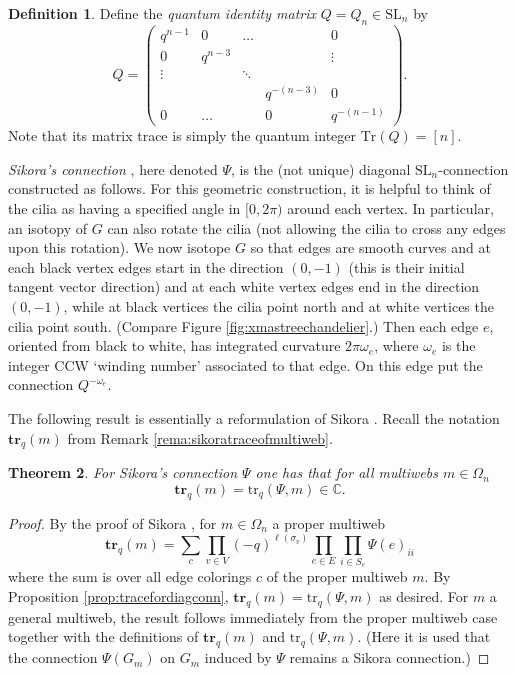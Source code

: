 \documentclass[12pt, reqno]{amsart}
\newtheorem{theo}{Theorem}[section]
\theoremstyle{definition}
\newtheorem{defi}[theo]{Definition}
\newcommand{\Tr}{\mathrm{Tr}}%
\newcommand{\trqc}{\mathrm{tr}_q}%
\newcommand{\trq}{\mathbf{tr}_q}%
\newcommand{\SL}{\mathrm{SL}}%
\begin{document}
\begin{defi}
Define the \emph{quantum identity matrix} $Q=Q_n\in\SL_n$ by
$$ 
Q = \begin{pmatrix} 
q^{n-1} & 0          & \dots&  & 0 \\
0          & q^{n-3} &&&\vdots \\
\vdots    &      & \ddots  &&\\
         &      & &q^{-(n-3)} & 0 \\
0          & \dots     && 0       & q^{-(n-1)}
\end{pmatrix}.
$$
Note that its matrix trace is simply the quantum integer $\Tr(Q) = [n]$. 

\emph{Sikora's connection} \cite[equation (5)]{sikora1}, 
here denoted $\Psi$, is the (not unique) diagonal $\SL_n$-connection constructed as follows.    For this geometric construction, it is helpful to think of the cilia as having a specified  angle in $[0,2\pi)$ around each vertex.    In particular, an isotopy of $G$ can also rotate the cilia (not allowing the cilia to cross any edges upon this rotation).  We now isotope $G$ so that edges are smooth curves and at each black vertex edges start in the direction  $(0,-1)$ (this is their initial tangent vector direction) and at each white vertex edges end in the direction $(0,-1)$, while at black vertices the cilia point north and at white vertices the cilia point south.  (Compare Figure \ref{fig:xmastreechandelier}.)  Then each edge $e$, oriented from black to white, has integrated curvature $2\pi\omega_e$, where $\omega_e$ is the integer CCW `winding number' associated to that edge.  On this edge put the connection  $Q^{-\omega_e}$.
\end{defi}

The following result is essentially a reformulation of Sikora \cite[Theorem 9]{sikora1}.  Recall the notation $\trq(m)$ from Remark \ref{rema:sikoratraceofmultiweb}.

\begin{theo}\label{theo:sikoraconnection}
For Sikora's connection $\Psi$ one has that for all multiwebs $m\in\Omega_n$
$$
\trq(m)=\trqc(\Psi,m)\in\mathbb{C}.
$$
\end{theo}

\begin{proof}
By the proof of Sikora \cite[Theorem 9]{sikora1}, for $m\in\Omega_n$ a proper multiweb
$$
\trq(m)=\sum_{c} \prod_{v\in V} (-q)^{\ell(\sigma_v)} \prod_{e\in E}  \prod_{i\in S_e} \Psi(e)_{ii}
$$
where the sum is over all edge colorings $c$ of the proper multiweb $m$.  By Proposition \ref{prop:tracefordiagconn}, $\trq(m)=\trqc(\Psi,m)$ as desired.  For $m$ a general multiweb, the result follows immediately from the proper multiweb case together with the definitions of $\trq(m)$ and $\trqc(\Psi,m)$.  (Here it is used that the connection $\Psi(G_m)$ on $G_m$ induced by $\Psi$ remains a Sikora connection.)
\end{proof}
\end{document}
